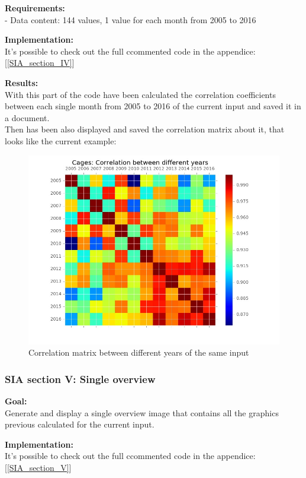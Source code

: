 \textbf{Requirements:}\\
- Data content: 144 values, 1 value for each month from 2005 to 2016

\textbf{Implementation:}\\
It's possible to check out the full ccommented code in the appendice: [\ref{SIA_section_IV}]


\textbf{Results:} \\
With this part of the code have been calculated the correlation coefficients between each single month from 2005 to 2016 of the current input and saved it in a document. \\
Then has been also displayed and saved the correlation matrix about it, that looks like the current example:

\begin{figure}[H]
	\centering
    \includegraphics[width=1\textwidth]{Files/Cages_Years_Matrix.jpg}
    \caption{Correlation matrix between different years of the same input}
\end{figure}


\newpage
\subsubsection{SIA section V: Single overview}

\textbf{Goal:}\\
Generate and display a single overview image that contains all the graphics previous calculated for the current input.

\textbf{Implementation:}\\
It's possible to check out the full ccommented code in the appendice: [\ref{SIA_section_V}]

